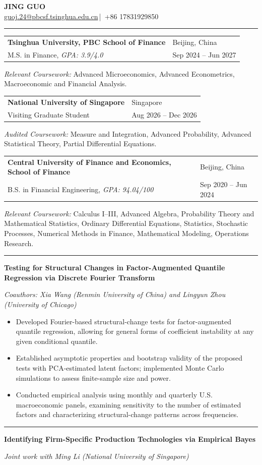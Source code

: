 \documentclass[10pt,letterpaper]{article}
\makeatletter
\newcommand{\name}[1]{\begin{center}{\LARGE\bfseries #1}\\[-1pt]\href{mailto:guoj.24@pbcsf.tsinghua.edu.cn}{guoj.24@pbcsf.tsinghua.edu.cn}\,|\, +86 17831929850\end{center}\vspace{0.06in}}
\newcommand{\sectiontitle}[1]{\vspace{0.085in}{\large\bfseries #1}\par\vspace{-3pt}\rule{\textwidth}{0.4pt}\par\vspace{0.04in}}
\newcommand{\eduentry}[4]{\begin{tabularx}{\textwidth}{@{}>{\raggedright\arraybackslash}X>{\raggedleft\arraybackslash}p{1.9in}@{}}\textbf{#1} & #2\\ #3 & #4\end{tabularx}}
\newcommand{\projentry}[1]{\textbf{#1}\par}
\makeatother
\begin{document}
\fontsize{10.75}{11.35}\selectfont
\name{JING GUO}

\sectiontitle{EDUCATION}

\eduentry{Tsinghua University, PBC School of Finance}
{Beijing, China}
{M.S. in Finance, \textit{GPA: 3.9/4.0}}
{Sep 2024 -- Jun 2027}
{\small \textit{Relevant Coursework:}
Advanced Microeconomics, Advanced Econometrics,
Macroeconomic and Financial Analysis.}

\eduentry{National University of Singapore}
{Singapore}
{Visiting Graduate Student}
{Aug 2026 -- Dec 2026}
{\small \textit{Audited Coursework:}
Measure and Integration,
Advanced Probability, Advanced Statistical Theory, Partial Differential Equations.}

\eduentry{Central University of Finance and Economics, School of Finance}
{Beijing, China}
{B.S. in Financial Engineering, \textit{GPA: 94.04/100}}
{Sep 2020 -- Jun 2024}
{\small \textit{Relevant Coursework:}
Calculus I--III, Advanced Algebra, Probability Theory and
Mathematical Statistics, Ordinary Differential Equations, Statistics, Stochastic Processes, Numerical Methods in Finance, Mathematical Modeling,
Operations Research.}

\sectiontitle{WORKING PAPER}
\projentry{Testing for Structural Changes in Factor-Augmented Quantile Regression via Discrete Fourier Transform}
\textit{Coauthors: Xia Wang (Renmin University of China) and Lingyun Zhou (University of Chicago)}
\begin{itemize}
 \item Developed Fourier-based structural-change tests for
factor-augmented quantile regression, allowing for general
forms of coefficient instability at any given conditional quantile.
 \item Established asymptotic properties and bootstrap validity of the proposed tests with PCA-estimated latent factors; implemented Monte Carlo simulations to assess finite-sample size and power.
 
\item Conducted empirical analysis using monthly and quarterly U.S.
macroeconomic panels, examining sensitivity to the number of
estimated factors and characterizing structural-change patterns
across frequencies.

\end{itemize}

\sectiontitle{RESEARCH IN PROGRESS}
\projentry{Identifying Firm-Specific Production Technologies via Empirical Bayes}
\textit{Joint work with Ming Li (National University of Singapore)}
\end{document}
